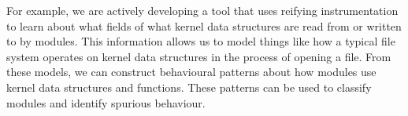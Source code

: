 \documentclass[preprint]{sigplanconf}
\begin{document}





For example, we are actively developing a tool that uses reifying instrumentation to learn about what fields of what kernel data structures are read from or written to by modules. This information allows us to model things like how a typical file system operates on kernel data structures in the process of opening a file. From these models, we can construct behavioural patterns about how modules use kernel data structures and functions. These patterns can be used to classify modules and identify spurious behaviour.
\end{document}

